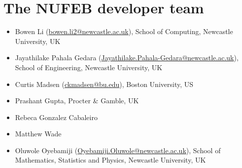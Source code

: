 \documentclass[11pt,a4paper,openright]{article}
\begin{document}
\newpage
\section{The NUFEB developer team}

\begin{itemize}  
\item
	Bowen Li (\href{mailto:bowen.li2@ncl.ac.uk}{bowen.li2@newcastle.ac.uk}),  School of Computing, Newcastle University, UK
\item
	Jayathilake Pahala Gedara (\href{Jayathilake.Pahala-Gedara@newcastle.ac.uk}{Jayathilake.Pahala-Gedara@newcastle.ac.uk}), School of Engineering, Newcastle University, UK
\item  
    Curtis Madsen (\href{ckmadsen@bu.edu}{ckmadsen@bu.edu}), Boston University, US
\item   	
	Prashant Gupta, Procter \& Gamble, UK
\item
	Rebeca Gonzalez Cabaleiro
\item
	Matthew Wade 
\item 
    Oluwole Oyebamiji (\href{Oyebamiji.Oluwole@newcastle.ac.uk}{Oyebamiji.Oluwole@newcastle.ac.uk}), School of Mathematics, Statistics and Physics, Newcastle University, UK

\end{itemize}
\end{document}
